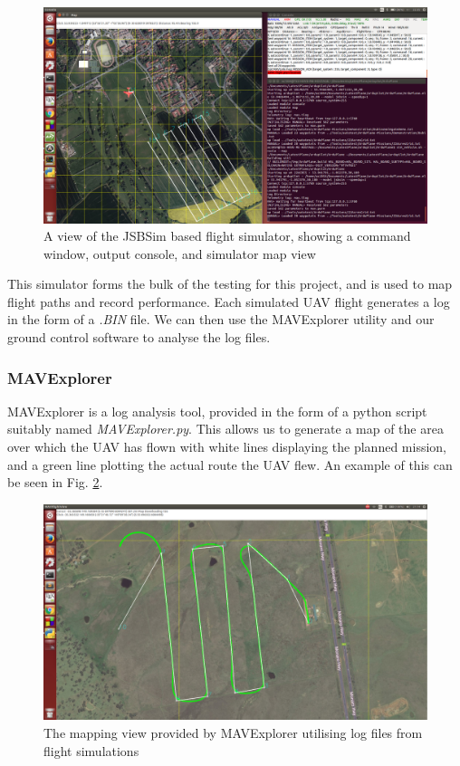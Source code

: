 \begin{figure}[htbp!] 
\centering    
\includegraphics[width=\textwidth]{JSBSim}
\caption[JSBSim Simulator]{A view of the JSBSim based flight simulator, showing a command window, output console, and simulator map view}
\label{fig:jsbsim}
\end{figure}

This simulator forms the bulk of the testing for this project, and is used to map flight paths and record performance. Each simulated UAV flight generates a log in the form of a \textit{.BIN} file. We can then use the MAVExplorer utility and our ground control software to analyse the log files. 

\subsubsection{MAVExplorer}
\label{intro:mavexplorer}
MAVExplorer is a log analysis tool, provided in the form of a python script suitably named \textit{MAVExplorer.py}. This allows us to generate a map of the area over which the UAV has flown with white lines displaying the planned mission, and a green line plotting the actual route the UAV flew. An example of this can be seen in Fig. \ref{fig:mavexplorer}.

\begin{figure}[htbp!] 
\centering    
\includegraphics[width=\textwidth]{MAVExplorer}
\caption[MAVExplorer Example]{The mapping view provided by MAVExplorer utilising log files from flight simulations}
\label{fig:mavexplorer}
\end{figure}

